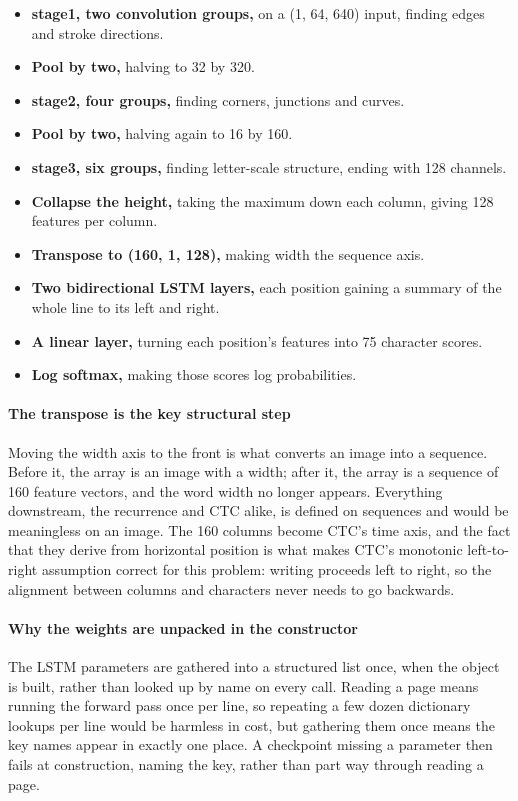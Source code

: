 \begin{itemize}\setlength\itemsep{0pt}
  \item \textbf{stage1, two convolution groups,} on a (1, 64, 640) input, finding edges and stroke directions.
  \item \textbf{Pool by two,} halving to 32 by 320.
  \item \textbf{stage2, four groups,} finding corners, junctions and curves.
  \item \textbf{Pool by two,} halving again to 16 by 160.
  \item \textbf{stage3, six groups,} finding letter-scale structure, ending with 128 channels.
  \item \textbf{Collapse the height,} taking the maximum down each column, giving 128 features per column.
  \item \textbf{Transpose to (160, 1, 128),} making width the sequence axis.
  \item \textbf{Two bidirectional LSTM layers,} each position gaining a summary of the whole line to its left and right.
  \item \textbf{A linear layer,} turning each position's features into 75 character scores.
  \item \textbf{Log softmax,} making those scores log probabilities.
\end{itemize}

\paragraph{The transpose is the key structural step}
Moving the width axis to the front is what converts an image into a sequence. Before it, the array is an image with a width; after it, the array is a sequence of 160 feature vectors, and the word width no longer appears. Everything downstream, the recurrence and CTC alike, is defined on sequences and would be meaningless on an image. The 160 columns become CTC's time axis, and the fact that they derive from horizontal position is what makes CTC's monotonic left-to-right assumption correct for this problem: writing proceeds left to right, so the alignment between columns and characters never needs to go backwards.


\paragraph{Why the weights are unpacked in the constructor}
The LSTM parameters are gathered into a structured list once, when the object is built, rather than looked up by name on every call. Reading a page means running the forward pass once per line, so repeating a few dozen dictionary lookups per line would be harmless in cost, but gathering them once means the key names appear in exactly one place. A checkpoint missing a parameter then fails at construction, naming the key, rather than part way through reading a page.


